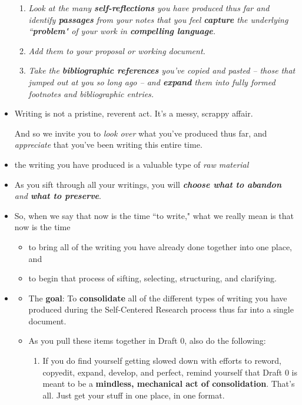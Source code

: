 \documentclass[11pt]{article}
\begin{document}
\begin{itemize}
\begin{enumerate}
\item \emph{Look at the many \textbf{self-reflections} you have produced thus far and identify \textbf{passages} from your notes that you feel \textbf{capture} the underlying ``\textbf{problem}" of your work in \textbf{compelling language}. }

\item \emph{Add them to your proposal or working document.}

\item \emph{Take the \textbf{bibliographic references} you’ve copied and pasted -- those that jumped out at you so long ago -- and \textbf{expand} them into fully formed footnotes and bibliographic entries.}
\end{enumerate}

\item Writing is not a pristine, reverent act. It’s a messy, scrappy affair.

And so we invite you to \emph{look over} what you've produced thus far, and \emph{appreciate} that you've been writing this entire time.

\item the writing you have produced is a valuable type of \emph{raw material}

\item As you sift through all your writings, you will \emph{\textbf{choose what to abandon} and \textbf{what to preserve}}.

\item So, when we say that now is the time ``to write," what we really mean is that now is the time 
\begin{itemize}
\item to bring all of the writing you have already done together into one place, and
\item to begin that process of sifting, selecting, structuring, and clarifying.
\end{itemize}

\item \begin{exercise}
\begin{itemize}
\item The \textbf{goal}: To \textbf{consolidate} all of the different types of writing you have produced during the Self-Centered Research process thus far into a single document.

\item As you pull these items together in Draft 0, also do the following:
\begin{enumerate}
\item  If you do find yourself getting slowed down with efforts to reword, copyedit, expand, develop, and perfect, remind yourself that Draft 0 is meant to be a \textbf{mindless, mechanical act of consolidation}. That’s all. Just get your stuff in one place, in one format.


\end{enumerate}
\end{itemize}
\end{exercise}
\end{itemize}
\end{document}
